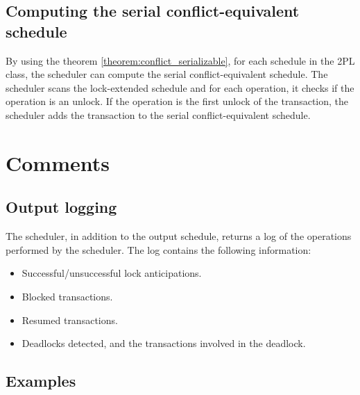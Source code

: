 \documentclass{article}
\begin{document}
\subsection{Computing the serial conflict-equivalent schedule}
By using the theorem \ref{theorem:conflict_serializable}, for each schedule in the 2PL class, the scheduler can compute the serial conflict-equivalent schedule. The scheduler scans the lock-extended schedule and for each operation, it checks if the operation is an unlock. If the operation is the first unlock of the transaction, the scheduler adds the transaction to the serial conflict-equivalent schedule.
\newpage
\section{Comments}
\subsection{Output logging}
The scheduler, in addition to the output schedule, returns a log of the operations performed by the scheduler. The log contains the following information:
\begin{itemize}
    \item Successful/unsuccessful lock anticipations.
    \item Blocked transactions.
    \item Resumed transactions.
    \item Deadlocks detected, and the transactions involved in the deadlock.
\end{itemize}
\subsection{Examples}
\end{document}
